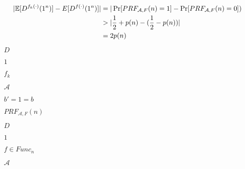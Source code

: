 \documentclass[10pt]{book}
\begin{document}
\begin{mdSnippets}
\begin{mdDisplaySnippet}[3e054ce6d7a05d640920b50bc8da5624]
\[%
\begin{aligned}
|\E[D^{f_k(\cdot)}(1^n)] - E[D^{f(\cdot)}(1^n)]| &= |\Pr[PRF_{\mathcal{A},F}(n) = 1] - \Pr[PRF_{\mathcal{A},F}(n) = 0]) \\
&> |\frac{1}{2} + p(n) - (\frac{1}{2} - p(n)) | \\
&= 2p(n)
\end{aligned}                                              
\]%
\end{mdDisplaySnippet}%
\begin{mdInlineSnippet}[f623e75af30e62bbd73d6df5b50bb7b5]%
$D$\end{mdInlineSnippet}%
\begin{mdInlineSnippet}[c4ca4238a0b923820dcc509a6f75849b]%
$1$\end{mdInlineSnippet}%
\begin{mdInlineSnippet}[f55fcd9745b34e40639d81c49eb07a8e]%
$f_k$\end{mdInlineSnippet}%
\begin{mdInlineSnippet}[ad70146b431bea9ae74cf8385470c544]%
$\mathcal{A}$\end{mdInlineSnippet}%
\begin{mdInlineSnippet}[2076ad26f17c5a5b0653e6174e3c9028]%
$b' = 1 = b$\end{mdInlineSnippet}%
\begin{mdInlineSnippet}%
$PRF_{\mathcal{A},F}(n)$\end{mdInlineSnippet}%
\begin{mdInlineSnippet}[f623e75af30e62bbd73d6df5b50bb7b5]%
$D$\end{mdInlineSnippet}%
\begin{mdInlineSnippet}[c4ca4238a0b923820dcc509a6f75849b]%
$1$\end{mdInlineSnippet}%
\begin{mdInlineSnippet}[ea5f4c914c5aa7061038128810237766]%
$f \in Func_n$\end{mdInlineSnippet}%
\begin{mdInlineSnippet}[ad70146b431bea9ae74cf8385470c544]%
$\mathcal{A}$\end{mdInlineSnippet}%
\begin{mdInlineSnippet}[c6f3aa80334059976c38a73914dd7d45]%

\end{mdInlineSnippet}
\end{mdSnippets}
\end{document}
